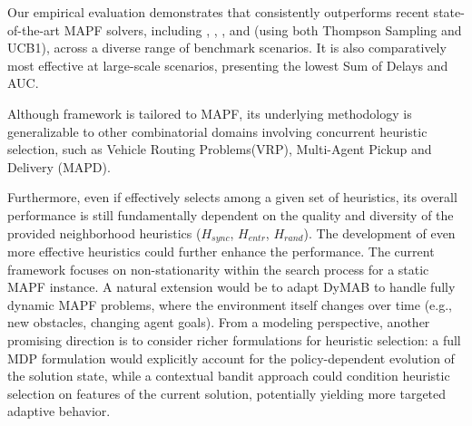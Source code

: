 \documentclass[review]{jair}
\begin{document}
Our empirical evaluation demonstrates that  consistently outperforms recent state-of-the-art MAPF solvers, including , , , and  (using both Thompson Sampling and UCB1), across a diverse range of benchmark scenarios. It is also comparatively most effective at large-scale scenarios, presenting the lowest Sum of Delays and AUC. 

Although  framework is tailored to MAPF, its underlying methodology is generalizable to other combinatorial domains involving concurrent heuristic selection, such as Vehicle Routing Problems(VRP), Multi-Agent Pickup and Delivery (MAPD).
%

Furthermore, even if  effectively selects among a given set of heuristics, its overall performance is still fundamentally dependent on the quality and diversity of the provided neighborhood heuristics ($H_{sync}$, $H_{entr}$, $H_{rand}$). The development of even more effective heuristics could further enhance the performance. The current  framework focuses on non-stationarity within the search process for a static MAPF instance. A natural extension would be to adapt DyMAB to handle fully dynamic MAPF problems, where the environment itself changes over time (e.g., new obstacles, changing agent goals). From a modeling perspective, another promising direction is to consider richer formulations for heuristic selection: a full MDP formulation would explicitly account for the policy-dependent evolution of the solution state, while a contextual bandit approach could condition heuristic selection on features of the current solution, potentially yielding more targeted adaptive behavior. 




\end{document}
